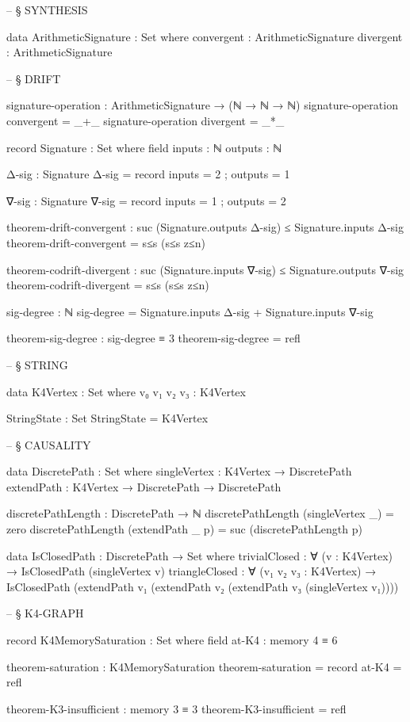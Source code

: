\documentclass[11pt,a4paper]{book}
\begin{document}
\begin{code}
-- § SYNTHESIS

data ArithmeticSignature : Set where
  convergent : ArithmeticSignature
  divergent  : ArithmeticSignature


-- § DRIFT

signature-operation : ArithmeticSignature → (ℕ → ℕ → ℕ)
signature-operation convergent = _+_
signature-operation divergent = _*_

record Signature : Set where
  field
    inputs  : ℕ
    outputs : ℕ

Δ-sig : Signature
Δ-sig = record { inputs = 2 ; outputs = 1 }

∇-sig : Signature
∇-sig = record { inputs = 1 ; outputs = 2 }

theorem-drift-convergent : suc (Signature.outputs Δ-sig) ≤ Signature.inputs Δ-sig
theorem-drift-convergent = s≤s (s≤s z≤n)

theorem-codrift-divergent : suc (Signature.inputs ∇-sig) ≤ Signature.outputs ∇-sig
theorem-codrift-divergent = s≤s (s≤s z≤n)

sig-degree : ℕ
sig-degree = Signature.inputs Δ-sig + Signature.inputs ∇-sig

theorem-sig-degree : sig-degree ≡ 3
theorem-sig-degree = refl



-- § STRING

data K4Vertex : Set where
  v₀ v₁ v₂ v₃ : K4Vertex

StringState : Set
StringState = K4Vertex


-- § CAUSALITY

data DiscretePath : Set where
  singleVertex : K4Vertex → DiscretePath
  extendPath   : K4Vertex → DiscretePath → DiscretePath

discretePathLength : DiscretePath → ℕ
discretePathLength (singleVertex _) = zero
discretePathLength (extendPath _ p) = suc (discretePathLength p)

data IsClosedPath : DiscretePath → Set where
  trivialClosed : ∀ (v : K4Vertex) → IsClosedPath (singleVertex v)
  triangleClosed : ∀ (v₁ v₂ v₃ : K4Vertex) → 
    IsClosedPath (extendPath v₁ (extendPath v₂ (extendPath v₃ (singleVertex v₁))))


-- § K4-GRAPH

record K4MemorySaturation : Set where
  field
    at-K4 : memory 4 ≡ 6

theorem-saturation : K4MemorySaturation
theorem-saturation = record { at-K4 = refl }


theorem-K3-insufficient : memory 3 ≡ 3
theorem-K3-insufficient = refl


\end{code}
\end{document}
